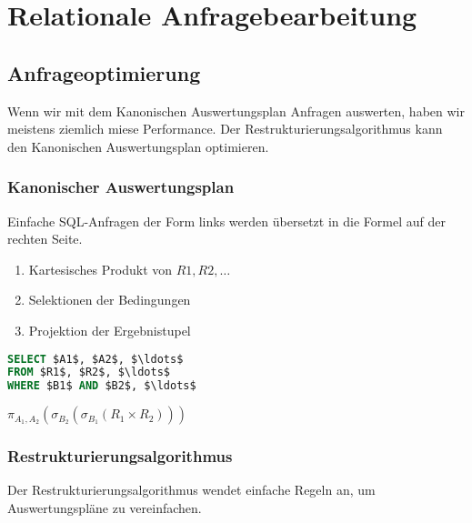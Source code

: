 \documentclass[a4paper,parskip=half*,DIV=15,fontsize=11pt]{scrartcl}
\begin{document}
\section{Relationale Anfragebearbeitung}
\subsection{Anfrageoptimierung}
Wenn wir mit dem Kanonischen Auswertungsplan Anfragen auswerten, haben wir meistens ziemlich miese Performance. Der Restrukturierungsalgorithmus kann den Kanonischen Auswertungsplan optimieren.

\subsubsection{Kanonischer Auswertungsplan}
Einfache SQL-Anfragen der Form links werden übersetzt in die Formel auf der rechten Seite.

\begin{minipage}[t]{0.58\textwidth}
\begin{enumerate}
  \item Kartesisches Produkt von $R1, R2, \ldots$
  \item Selektionen der Bedingungen
  \item Projektion der Ergebnistupel
\end{enumerate}
\end{minipage}\hspace{0.02\textwidth}
\begin{minipage}[t]{0.30\textwidth}
\begin{lstlisting}[language=SQL,mathescape,belowskip=0.1\baselineskip]
SELECT $A1$, $A2$, $\ldots$
FROM $R1$, $R2$, $\ldots$
WHERE $B1$ AND $B2$, $\ldots$
\end{lstlisting}%
\begin{center}%
%
\end{center}
$\pi_{A_1, A_2}(\sigma_{B_2}(\sigma_{B_1}(R_1 \times R_2)))$
\end{minipage}

\subsubsection{Restrukturierungsalgorithmus}

Der Restrukturierungsalgorithmus wendet einfache Regeln an, um Auswertungspläne zu vereinfachen.
\end{document}
